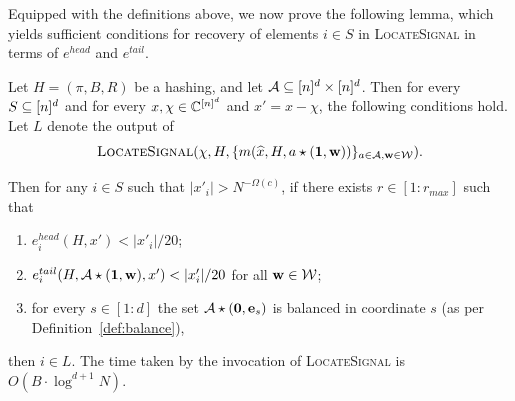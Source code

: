 Equipped with the definitions above,  we now prove the following lemma, which yields sufficient conditions for recovery of elements $i\in S$ in \textsc{LocateSignal} in terms of $e^{head}$ and $e^{tail}$.
\begin{lemma}\label{lm:loc}
Let $H=(\pi, B, R)$ be a hashing, and let ${\mathcal{A}}\subseteq {[n]^d}\times {[n]^d}$. Then for every $S\subseteq {[n]^d}$ and for every $x, \chi\in \mathbb{C}^{{[n]^d}}$ and $x'=x-\chi$, the following conditions hold.
Let $L$ denote the output of 
$$
\Call{LocateSignal}{\chi, H, \{m(\wh{x}, H, a\star (\one, \h))\}_{a\in \A, \h\in \H}}.
$$

Then for any $i\in S$ such that $|x'_i|>N^{-\Omega(c)}$, if there exists $r\in [1:r_{max}]$ such that 
\begin{enumerate}
\item  $e^{head}_{i}(H, x')<|x'_i|/20$;
\item  $e^{tail}_{i}(H, {\mathcal{A}}\star (\mathbf{1}, \mathbf{w}), x')< |x'_i|/20$ for all $\mathbf{w}\in \mathcal{W}$;
\item for every $s\in [1:d]$ the set ${\mathcal{A}}\star(\mathbf{0}, \mathbf{e}_s)$ is balanced in coordinate $s$ (as per Definition~\ref{def:balance}),
\end{enumerate}
 then $i\in L$. The time taken by the invocation of \textsc{LocateSignal} is $O(B\cdot \log^{d+1} N)$.
\end{lemma}
